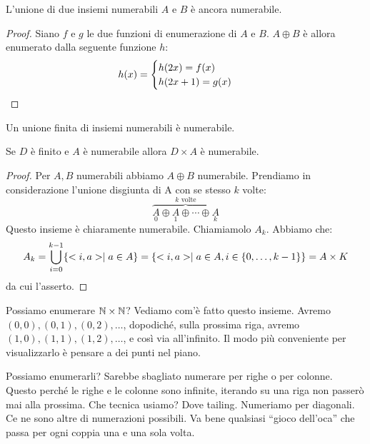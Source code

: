 \begin{lem}
    L'unione di due insiemi numerabili $A$ e $B$ è ancora numerabile.
\end{lem}
\begin{proof}
    Siano $f$ e $g$ le due funzioni di enumerazione di $A$ e $B$. $A \oplus B$ è allora enumerato dalla seguente
    funzione $h$:
    \begin{equation*}
        h(x) =
        \begin{cases}
            h(2x)=f(x) \quad &\text{}\\
            h(2x+1)=g(x) \quad &\text{}\\
        \end{cases}
    \end{equation*}
\end{proof}

\begin{cor}
    Un unione finita di insiemi numerabili è numerabile.
\end{cor}
\begin{cor}
    Se $D$ è finito e $A$ è numerabile allora $D \times A$ è numerabile.
\end{cor}
\begin{proof}
    Per $A,B$ numerabili abbiamo $A \oplus B$ numerabile. Prendiamo in considerazione l'unione
    disgiunta di A con se stesso $k$ volte:
    \begin{equation*}
        \overbrace{\underset{0}{A} \oplus \underset{1}{A} \oplus \cdots \oplus
        \underset{k}{A}}^{\text{$k$ volte}}
    \end{equation*}
    Questo insieme è chiaramente numerabile. Chiamiamolo $A_{k}$. Abbiamo che:
    \begin{equation*}
        A_{k} = \bigcup_{i=0}^{k-1}\{<i,a> \mid a \in A\} = \{<i,a> \mid a \in A, i \in
        \{0,\dotsc,k-1\}\} = A \times K
    \end{equation*}
    da cui l'asserto.
\end{proof}

Possiamo enumerare $\mathbb{N} \times \mathbb{N}$? Vediamo com'è fatto questo insieme. Avremo $(0,0), (0,1),
(0,2),\dotsc$, dopodiché, sulla prossima riga, avremo $(1,0), (1,1), (1,2),\dotsc$, e così via
all'infinito. Il modo più conveniente per visualizzarlo è pensare a dei punti nel piano. 

Possiamo enumerarli? Sarebbe sbagliato numerare per righe o per colonne. Questo perché le righe e
le colonne sono infinite, iterando su una riga non passerò mai alla prossima. Che tecnica usiamo?
Dove tailing. Numeriamo per diagonali. Ce ne sono altre di numerazioni possibili. Va bene qualsiasi
``gioco dell'oca'' che passa per ogni coppia una e una sola volta.

